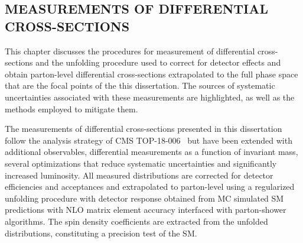 \begin{refsection}


\chapter{MEASUREMENTS OF DIFFERENTIAL CROSS-SECTIONS}
\label{Measurements_of_Differential_Cross-sections}

\begin{cabstract}
This chapter discusses the procedures for measurement of differential cross-sections and the unfolding procedure used to correct for detector effects and obtain parton-level differential cross-sections extrapolated to the full phase space that are the focal points of the this dissertation.
The sources of systematic uncertainties associated with these measurements are highlighted, as well as the methods employed to mitigate them. 
\end{cabstract}

The measurements of differential cross-sections presented in this dissertation follow the analysis strategy of CMS TOP-18-006~\cite{Sirunyan:2681777} but have been extended with additional observables, differential measurements as a function of \ttbar invariant mass, several optimizations that reduce systematic uncertainties and significantly increased luminosity.
All measured distributions are corrected for detector efficiencies and acceptances and extrapolated to parton-level using a regularized unfolding procedure with detector response obtained from MC simulated SM predictions with NLO matrix element accuracy interfaced with parton-shower algorithms.
The spin density coefficients are extracted from the unfolded distributions, constituting a precision test of the SM.


\end{refsection}
